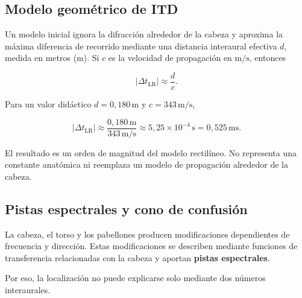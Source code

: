 
\subsection{Modelo geométrico de ITD}
\label{sec:u7-modelo-itd}

Un modelo inicial ignora la difracción alrededor de la cabeza y aproxima la
máxima diferencia de recorrido mediante una distancia interaural efectiva
\(d\), medida en metros (\(\text{m}\)). Si \(c\) es la velocidad de
propagación en \(\text{m}/\text{s}\), entonces

\begin{equation}
    \lvert\Delta t_\mathrm{LR}\rvert
      \approx\frac{d}{c}.
    \label{eq:u7-itd-geometrica}
\end{equation}

Para un valor didáctico \(d=0{,}180\,\text{m}\) y
\(c=343\,\text{m}/\text{s}\),

\[
    \lvert\Delta t_\mathrm{LR}\rvert
      \approx\frac{0{,}180\,\text{m}}{343\,\text{m}/\text{s}}
      \approx5{,}25\times10^{-4}\,\text{s}
      =0{,}525\,\text{ms}.
\]

El resultado es un orden de magnitud del modelo rectilíneo. No representa una
constante anatómica ni reemplaza un modelo de propagación alrededor de la
cabeza.

\subsection{Pistas espectrales y cono de confusión}
\label{sec:u7-pistas-espectrales}

La cabeza, el torso y los pabellones producen modificaciones dependientes de
frecuencia y dirección. Estas modificaciones se describen mediante funciones
de transferencia relacionadas con la cabeza y aportan
\textbf{pistas espectrales}.

 Por eso, la localización no puede explicarse
solo mediante dos números interaurales.

